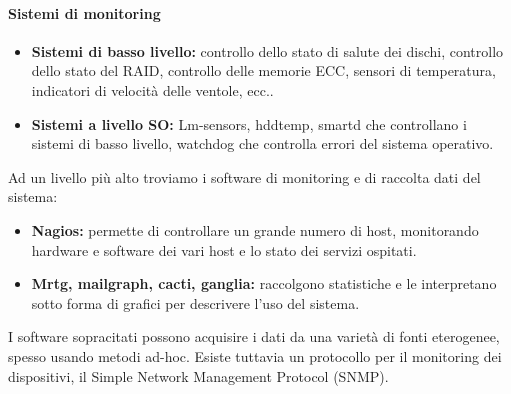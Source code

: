 \documentclass[a4paper]{report}
\begin{document}
\paragraph{Sistemi di monitoring} 
\begin{itemize}
\item \textbf{Sistemi di basso livello:} controllo dello stato di salute dei dischi, controllo dello stato del RAID, controllo delle memorie ECC, sensori di temperatura, indicatori di velocità delle ventole, ecc..
\item \textbf{Sistemi a livello SO:} Lm-sensors, hddtemp, smartd che controllano i sistemi di basso livello, watchdog che controlla errori del sistema operativo.
\end{itemize}
Ad un livello più alto troviamo i software di monitoring e di raccolta dati del sistema:
\begin{itemize}
\item \textbf{Nagios:} permette di controllare un grande numero di host, monitorando hardware e software dei vari host e lo stato dei servizi ospitati.
\item \textbf{Mrtg, mailgraph, cacti, ganglia:} raccolgono statistiche e le interpretano sotto forma di grafici per descrivere l'uso del sistema.
\end{itemize}
I software sopracitati possono acquisire i dati da una varietà di fonti eterogenee, spesso usando metodi ad-hoc. Esiste tuttavia un protocollo per il monitoring dei dispositivi, il Simple Network Management Protocol (SNMP).
\end{document}
